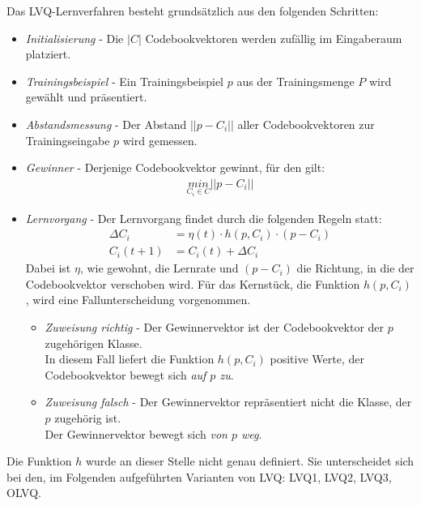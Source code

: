 Das LVQ-Lernverfahren besteht grundsätzlich aus den folgenden Schritten:
\begin{itemize}
	\item \emph{Initialisierung} - Die $|C|$ Codebookvektoren werden zufällig im Eingaberaum platziert.
	\item \emph{Trainingsbeispiel} - Ein Trainingsbeispiel $p$ aus der Trainingsmenge $P$ wird gewählt und präsentiert.
	\item \emph{Abstandsmessung} - Der Abstand $||p - C_i||$ aller Codebookvektoren zur Trainingseingabe $p$ wird gemessen.
	\item \emph{Gewinner} - Derjenige Codebookvektor gewinnt, für den gilt:
	\begin{align*}
		\underset{C_i \in C}{min} ||p - C_i||		
	\end{align*}
	\item \emph{Lernvorgang} - Der Lernvorgang findet durch die folgenden Regeln statt:
	\begin{align*}
		\Delta C_i &= \eta(t) \cdot h(p, C_i) \cdot (p-C_i) \\
		C_i(t+1) &= C_i(t) + \Delta C_i
	\end{align*}
	Dabei ist $\eta$, wie gewohnt, die Lernrate und $(p-C_i)$ die Richtung, in die der Codebookvektor verschoben wird.
	Für das Kernstück, die Funktion $h(p, C_i)$, wird eine Fallunterscheidung vorgenommen.
	\begin{itemize}
		\item \emph{Zuweisung richtig} - Der Gewinnervektor ist der Codebookvektor der $p$ zugehörigen Klasse.\\
		In diesem Fall liefert die Funktion $h(p, C_i)$ positive Werte, der Codebookvektor bewegt sich \emph{auf $p$ zu}.
		\item \emph{Zuweisung falsch} - Der Gewinnervektor repräsentiert nicht die Klasse, der $p$ zugehörig ist.\\
		Der Gewinnervektor bewegt sich \emph{von $p$ weg}.
	\end{itemize}
\end{itemize}

Die Funktion $h$ wurde an dieser Stelle nicht genau definiert. Sie unterscheidet sich bei den, im Folgenden aufgeführten Varianten von LVQ: LVQ1, LVQ2, LVQ3, OLVQ.


